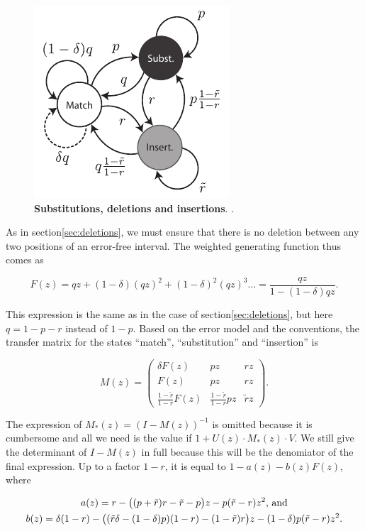 \documentclass{article}
\begin{document}
\begin{figure}[h]
\centering
\includegraphics[scale=0.9]{insertions.pdf}
\caption{\textbf{Substitutions, deletions and insertions}.
.}
\label{fig:insertions}
\end{figure}

As in section\ref{sec:deletions}, we must ensure that there is no deletion
between any two positions of an error-free interval. The weighted
generating function thus comes as

\begin{equation*}
F(z) = qz + (1-\delta)(qz)^2 + (1-\delta)^2(qz)^3 \ldots =
\frac{qz}{1-(1-\delta)qz}.
\end{equation*}

This expression is the same as in the case of section\ref{sec:deletions},
but here $q = 1-p-r$ instead of $1-p$. Based on the error model and the
conventions, the transfer matrix for the states ``match'',
``substitution'' and ``insertion'' is

\begin{equation*}
M(z) = \left(
\begin{matrix}
\delta F(z) & pz      & rz  \\
F(z)        & pz      & rz  \\
\frac{1-\tilde{r}}{1-r}F(z)   & \frac{1-\tilde{r}}{1-r}pz & \tilde{r}z
\end{matrix}
\right).
\end{equation*}

The expression of $M_*(z) = (I-M(z))^{-1}$ is omitted because it is
cumbersome and all we need is the value if $1+U(z)\cdot M_*(z)\cdot V$.
We still give the determinant of $I-M(z)$ in full because this will be the
denomiator of the final expression. Up to a factor $1-r$, it is equal to
$1-a(z)-b(z)F(z)$, where

\begin{gather}
\label{eq:a+b}
a(z) = r-\big((p+\tilde{r})r-\tilde{r}-p\big)z
- p(\tilde{r}-r)z^2\text{, and} \\
b(z) = \delta(1-r) - \big((\tilde{r}\delta-(1-\delta)p)(1-r)
-(1-\tilde{r})r\big)z -(1-\delta)p(\tilde{r}-r)z^2.
\notag
\end{gather}
\end{document}
